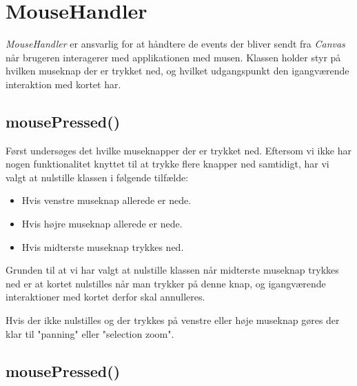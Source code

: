 \section{MouseHandler}

\emph{MouseHandler} er ansvarlig for at håndtere de events der bliver sendt fra \emph{Canvas} når brugeren interagerer med applikationen med musen. Klassen holder styr på hvilken museknap der er trykket ned, og hvilket udgangspunkt den igangværende interaktion med kortet har.

\subsection{mousePressed()}

Først undersøges det hvilke museknapper der er trykket ned. Eftersom vi ikke har nogen funktionalitet knyttet til at trykke flere knapper ned samtidigt, har vi valgt at nulstille klassen i følgende tilfælde:

\begin{itemize}
  \item Hvis venstre museknap allerede er nede.
  \item Hvis højre museknap allerede er nede.
  \item Hvis midterste museknap trykkes ned.
\end{itemize}

Grunden til at vi har valgt at nulstille klassen når midterste museknap trykkes ned er at kortet nulstilles når man trykker på denne knap, og igangværende interaktioner med kortet derfor skal annulleres.

Hvis der ikke nulstilles og der trykkes på venstre eller høje museknap gøres der klar til "panning" eller "selection zoom".

\subsection{mousePressed()}

